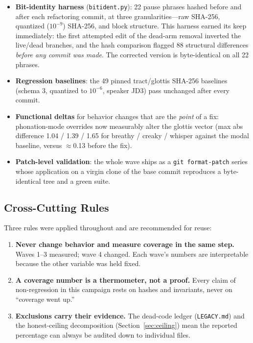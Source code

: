 \documentclass[11pt,a4paper]{article}
\newcommand{\code}[1]{\texttt{#1}}
\begin{document}
\begin{itemize}[leftmargin=1.4em, itemsep=0.15em]
  \item \textbf{Bit-identity harness} (\code{bitident.py}): 22 pause
        phrases hashed before and after each refactoring commit, at
        three granularities---raw SHA-256, quantized ($10^{-9}$)
        SHA-256, and block structure. This harness earned its keep
        immediately: the first attempted edit of the dead-arm removal
        inverted the live/dead branches, and the hash comparison
        flagged 88 structural differences \emph{before any commit was
        made}. The corrected version is byte-identical on all 22
        phrases.
  \item \textbf{Regression baselines}: the 49 pinned
        tract/glottis SHA-256 baselines (schema 3, quantized to
        $10^{-6}$, speaker JD3) pass unchanged after every commit.
  \item \textbf{Functional deltas} for behavior changes that are the
        \emph{point} of a fix: phonation-mode overrides now
        measurably alter the glottis vector (max abs difference
        1.04 / 1.39 / 1.65 for breathy / creaky / whisper against
        the modal baseline, versus $\approx$0.13 before the fix).
  \item \textbf{Patch-level validation}: the whole wave ships as a
        \code{git format-patch} series whose application on a virgin
        clone of the base commit reproduces a byte-identical tree and
        a green suite.
\end{itemize}

\subsection{Cross-Cutting Rules}
\label{sec:rules}

Three rules were applied throughout and are recommended for reuse:

\begin{enumerate}[leftmargin=1.6em, itemsep=0.2em]
  \item \textbf{Never change behavior and measure coverage in the same
        step.} Waves 1--3 measured; wave 4 changed. Each wave's numbers
        are interpretable because the other variable was held fixed.
  \item \textbf{A coverage number is a thermometer, not a proof.}
        Every claim of non-regression in this campaign rests on hashes
        and invariants, never on ``coverage went up.''
  \item \textbf{Exclusions carry their evidence.} The dead-code ledger
        (\code{LEGACY.md}) and the honest-ceiling decomposition
        (Section~\ref{sec:ceiling}) mean the reported percentage can
        always be audited down to individual files.
\end{enumerate}
\end{document}
